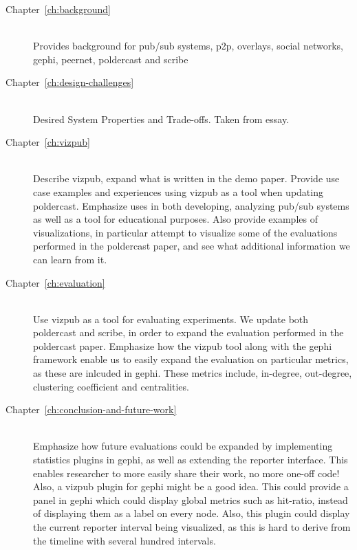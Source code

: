 \begin{description}
    \item[Chapter~\ref{ch:background}] \hfill \\
        Provides background for pub/sub systems, p2p, overlays, social
        networks, gephi, peernet, poldercast and scribe
    \item[Chapter~\ref{ch:design-challenges}] \hfill \\
        Desired System Properties and Trade-offs. Taken from essay.
    \item[Chapter~\ref{ch:vizpub}] \hfill \\
        Describe vizpub, expand what is written in the demo paper.
        Provide use case examples and experiences using vizpub as a tool
        when updating poldercast. Emphasize uses in both developing,
        analyzing pub/sub systems as well as a tool for educational
        purposes. Also provide examples of visualizations, in particular
        attempt to visualize some of the evaluations performed in the
        poldercast paper, and see what additional information we can
        learn from it.
    \item[Chapter~\ref{ch:evaluation}] \hfill \\
        Use vizpub as a tool for evaluating experiments. We update both
        poldercast and scribe, in order to expand the evaluation
        performed in the poldercast paper. Emphasize how the vizpub tool
        along with the gephi framework enable us to easily expand the
        evaluation on particular metrics, as these are inlcuded in
        gephi. These metrics include, in-degree, out-degree, clustering
        coefficient and centralities.
    \item[Chapter~\ref{ch:conclusion-and-future-work}] \hfill \\
        Emphasize how future evaluations could be expanded by
        implementing statistics plugins in gephi, as well as extending
        the reporter interface. This enables researcher to more easily
        share their work, no more one-off code! Also, a vizpub plugin
        for gephi might be a good idea. This could provide a panel in
        gephi which could display global metrics such as hit-ratio,
        instead of displaying them as a label on every node. Also, this
        plugin could display the current reporter interval being
        visualized, as this is hard to derive from the timeline with
        several hundred intervals.
\end{description}
